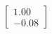 \documentclass[preview]{standalone}
\begin{document}
\begin{align*}
\begin{bmatrix} 1.00 \\ -0.08 \end{bmatrix}
\end{align*}
\end{document}
